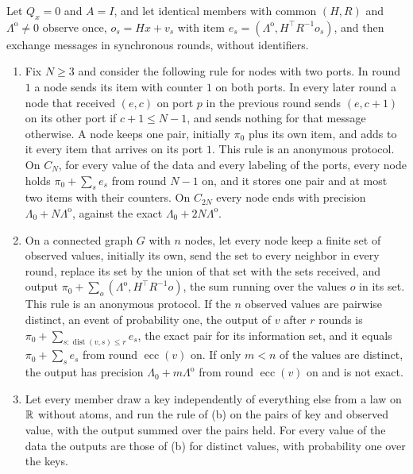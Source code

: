 \begin{proposition}\label{prop:prv-anon}
Let $Q_x=0$ and $A=I$, and let identical members with common $(H,R)$ and $\Lambda^{\mathrm o}\ne0$ observe once, $o_s=Hx+v_s$ with item $e_s=(\Lambda^{\mathrm o},H^\top R^{-1}o_s)$, and then exchange messages in synchronous rounds, without identifiers.
\begin{enumerate}
\item[(a)] Fix $N\ge3$ and consider the following rule for nodes with two ports. In round $1$ a node sends its item with counter $1$ on both ports. In every later round a node that received $(e,c)$ on port $p$ in the previous round sends $(e,c+1)$ on its other port if $c+1\le N-1$, and sends nothing for that message otherwise. A node keeps one pair, initially $\pi_0$ plus its own item, and adds to it every item that arrives on its port $1$. This rule is an anonymous protocol. On $C_N$, for every value of the data and every labeling of the ports, every node holds $\pi_0+\sum_se_s$ from round $N-1$ on, and it stores one pair and at most two items with their counters. On $C_{2N}$ every node ends with precision $\Lambda_0+N\Lambda^{\mathrm o}$, against the exact $\Lambda_0+2N\Lambda^{\mathrm o}$.
\item[(b)] On a connected graph $G$ with $n$ nodes, let every node keep a finite set of observed values, initially its own, send the set to every neighbor in every round, replace its set by the union of that set with the sets received, and output $\pi_0+\sum_o(\Lambda^{\mathrm o},H^\top R^{-1}o)$, the sum running over the values $o$ in its set. This rule is an anonymous protocol. If the $n$ observed values are pairwise distinct, an event of probability one, the output of $v$ after $r$ rounds is $\pi_0+\sum_{s:\operatorname{dist}(v,s)\le r}e_s$, the exact pair for its information set, and it equals $\pi_0+\sum_se_s$ from round $\operatorname{ecc}(v)$ on. If only $m<n$ of the values are distinct, the output has precision $\Lambda_0+m\Lambda^{\mathrm o}$ from round $\operatorname{ecc}(v)$ on and is not exact.
\item[(c)] Let every member draw a key independently of everything else from a law on $\mathbb{R}$ without atoms, and run the rule of (b) on the pairs of key and observed value, with the output summed over the pairs held. For every value of the data the outputs are those of (b) for distinct values, with probability one over the keys.
\end{enumerate}
\end{proposition}


